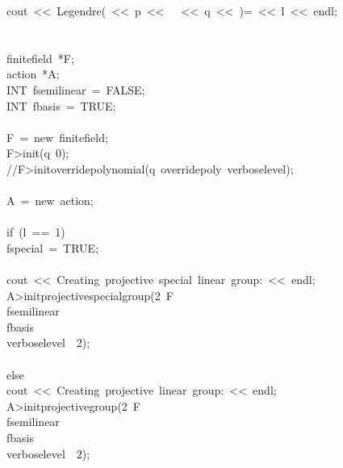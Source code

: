 \begin{tabbing}
\>cout\ <<\ Legendre(\ <<\ p\ <<\ \ \ <<\ q\ <<\ )=\ <<\ l\ <<\ endl;\\[0pt]
\\[0pt]
\\[0pt]
\>finitefield\ *F;\\[0pt]
\>action\ *A;\\[0pt]
\>INT\ fsemilinear\ =\ FALSE;\\[0pt]
\>INT\ fbasis\ =\ TRUE;\\[0pt]
\\[0pt]
\>F\ =\ new\ finitefield;\\[0pt]
\>F>init(q\ 0);\\[0pt]
\>//F>initoverridepolynomial(q\ overridepoly\ verboselevel);\\[0pt]
\\[0pt]
\>A\ =\ new\ action;\\[0pt]
\>\\[0pt]
\>if\ (l\ ==\ 1)\ \\[0pt]
\>\>fspecial\ =\ TRUE;\\[0pt]
\\[0pt]
\>\>cout\ <<\ Creating\ projective\ special\ linear\ group:\ <<\ endl;\ \\[0pt]
\>\>A>initprojectivespecialgroup(2\ F\ \\[0pt]
\>\>\>fsemilinear\ \\[0pt]
\>\>\>fbasis\ \\[0pt]
\>\>\>verboselevel\ \ 2);\>\>\\[0pt]
\>\>\\[0pt]
\>else\ \\[0pt]
\>\>cout\ <<\ Creating\ projective\ linear\ group:\ <<\ endl;\ \\[0pt]
\>\>A>initprojectivegroup(2\ F\ \\[0pt]
\>\>\>fsemilinear\ \\[0pt]
\>\>\>fbasis\ \\[0pt]
\>\>\>verboselevel\ \ 2);\>\>\\[0pt]

\end{tabbing}
